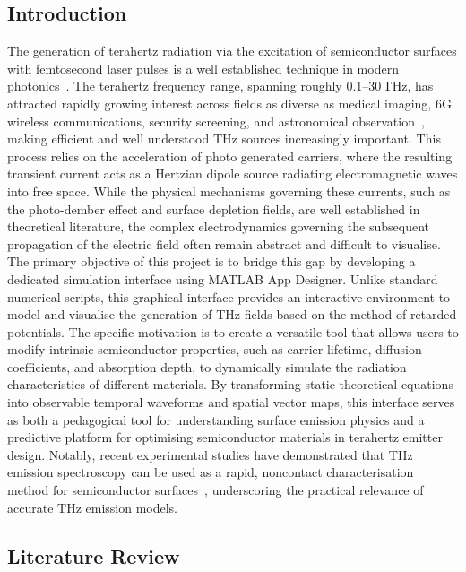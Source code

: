\documentclass[12pt]{final_project_report}
\begin{document}
\subsection{Introduction}
The generation of terahertz radiation via the excitation of semiconductor surfaces with femtosecond laser pulses is a well established technique in modern photonics~\cite{Pettine2023}. The terahertz frequency range, spanning roughly 0.1--30\,THz, has attracted rapidly growing interest across fields as diverse as medical imaging, 6G wireless communications, security screening, and astronomical observation~\cite{Leitenstorfer2023}, making efficient and well understood THz sources increasingly important. This process relies on the acceleration of photo generated carriers, where the resulting transient current acts as a Hertzian dipole source radiating electromagnetic waves into free space. While the physical mechanisms governing these currents, such as the photo-dember effect and surface depletion fields, are well established in theoretical literature, the complex electrodynamics governing the subsequent propagation of the electric field often remain abstract and difficult to visualise.
\newline
The primary objective of this project is to bridge this gap by developing a dedicated simulation interface using MATLAB App Designer. Unlike standard numerical scripts, this graphical interface provides an interactive environment to model and visualise the generation of THz fields based on the method of retarded potentials. The specific motivation is to create a versatile tool that allows users to modify intrinsic semiconductor properties, such as carrier lifetime, diffusion coefficients, and absorption depth, to dynamically simulate the radiation characteristics of different materials. By transforming static theoretical equations into observable temporal waveforms and spatial vector maps, this interface serves as both a pedagogical tool for understanding surface emission physics and a predictive platform for optimising semiconductor materials in terahertz emitter design. Notably, recent experimental studies have demonstrated that THz emission spectroscopy can be used as a rapid, noncontact characterisation method for semiconductor surfaces~\cite{YangTonouchi2022}, underscoring the practical relevance of accurate THz emission models.

\subsection{Literature Review}
\end{document}
